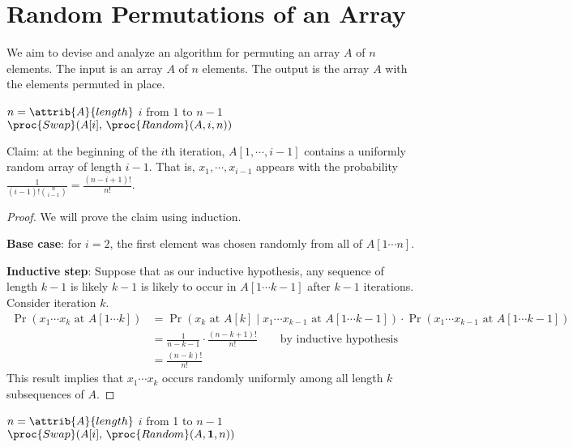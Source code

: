 \section{Random Permutations of an Array}

We aim to devise and analyze an algorithm for permuting an array $A$ of $n$ elements. The input is an array $A$ of $n$ elements. The output is the array $A$ with the elements permuted in place.

\begin{codebox}
    \li $n = \attrib{A}{length}$ 
    \li \For $i$ from $1$ to $n-1$ \Do
        \li $\proc{Swap}(A[i],\, \proc{Random}(A,i,n))$ 
\end{codebox}

Claim: at the beginning of the $i$th iteration, $A[1,\cdots,i-1]$ contains a uniformly random array of length $i-1$. That is, $x_1,\cdots,x_{i-1}$ appears with the probability $\frac{1}{(i-1)! {n \choose i-1}} = \frac{(n-i+1)!}{n!}$.

\begin{proof}
    We will prove the claim using induction.

    \textbf{Base case}: for $i=2$, the first element was chosen randomly from all of $A[1\cdots n]$.

    \textbf{Inductive step}: Suppose that as our inductive hypothesis, any sequence of length $k-1$ is likely $k-1$ is likely to occur in $A[1 \cdots k-1]$ after $k-1$ iterations. Consider iteration $k$.
    $$
    \begin{aligned}
        \Pr(\text{$x_1 \cdots x_k$ at $A[1 \cdots k]$}) &= \Pr(\text{$x_k$ at $A[k]$} \mid \text{$x_1 \cdots x_{k-1}$ at $A[1 \cdots k-1]$}) \cdot \Pr(\text{$x_1 \cdots x_{k-1}$ at $A[1 \cdots k-1]$}) \\
        &= \frac{1}{n-k-1} \cdot \frac{(n-k+1)!}{n!} \qquad \text{by inductive hypothesis} \\
        &= \frac{(n-k)!}{n!}
    \end{aligned}
    $$
    This result implies that $x_1 \cdots x_k$ occurs randomly uniformly among all length $k$ subsequences of $A$.
\end{proof}

\begin{codebox}
    \li $n = \attrib{A}{length}$ 
    \li \For $i$ from 1 to $n-1$ \Do
        \li $\proc{Swap}(A[i],\, \proc{Random}(A,\textbf{1},n))$ 
\end{codebox}

